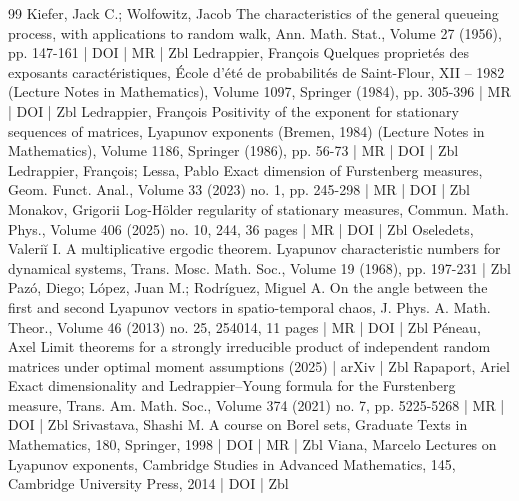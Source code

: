 \begin{thebibliography}{99}
 Kiefer, Jack C.; Wolfowitz, Jacob The characteristics of the general queueing process, with applications to random walk, Ann. Math. Stat., Volume 27 (1956), pp. 147-161 | DOI | MR | Zbl
 Ledrappier, François Quelques proprietés des exposants caractéristiques, École d’été de probabilités de Saint-Flour, XII – 1982 (Lecture Notes in Mathematics), Volume 1097, Springer (1984), pp. 305-396 | MR | DOI | Zbl
 Ledrappier, François Positivity of the exponent for stationary sequences of matrices, Lyapunov exponents (Bremen, 1984) (Lecture Notes in Mathematics), Volume 1186, Springer (1986), pp. 56-73 | MR | DOI | Zbl
 Ledrappier, François; Lessa, Pablo Exact dimension of Furstenberg measures, Geom. Funct. Anal., Volume 33 (2023) no. 1, pp. 245-298 | MR | DOI | Zbl
 Monakov, Grigorii Log-Hölder regularity of stationary measures, Commun. Math. Phys., Volume 406 (2025) no. 10, 244, 36 pages | MR | DOI | Zbl
 Oseledets, Valeriĭ I. A multiplicative ergodic theorem. Lyapunov characteristic numbers for dynamical systems, Trans. Mosc. Math. Soc., Volume 19 (1968), pp. 197-231 | Zbl
 Pazó, Diego; López, Juan M.; Rodríguez, Miguel A. On the angle between the first and second Lyapunov vectors in spatio-temporal chaos, J. Phys. A. Math. Theor., Volume 46 (2013) no. 25, 254014, 11 pages | MR | DOI | Zbl
 Péneau, Axel Limit theorems for a strongly irreducible product of independent random matrices under optimal moment assumptions (2025) | arXiv | Zbl
 Rapaport, Ariel Exact dimensionality and Ledrappier–Young formula for the Furstenberg measure, Trans. Am. Math. Soc., Volume 374 (2021) no. 7, pp. 5225-5268 | MR | DOI | Zbl
 Srivastava, Shashi M. A course on Borel sets, Graduate Texts in Mathematics, 180, Springer, 1998 | DOI | MR | Zbl
 Viana, Marcelo Lectures on Lyapunov exponents, Cambridge Studies in Advanced Mathematics, 145, Cambridge University Press, 2014 | DOI | Zbl
\end{thebibliography}
